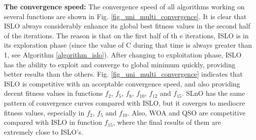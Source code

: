 \documentclass[a4paper,13pt,2p]{report}
\begin{document}
	\textbf{The convergence speed:} The convergence speed of all algorithms working on several functions are shown in Fig. \ref{fig_uni_multi_convergence}. It is clear that ISLO always considerably enhance its global best fitness values in the second half of the iterations. The reason is that on the first half of th e iterations, ISLO is in its exploration phase (since the value of C during that time is always greater than 1, see Algorithm \ref{algorithm_islo}). After changing to exploitation phase, ISLO has the ability to exploit and converge to global minimum quickly, providing better results than the others. Fig. \ref{fig_uni_multi_convergence} indicates that ISLO is competitive with an acceptable convergence speed, and also providing decent fitness values in functions $f_2$, $f_5$, $f_8$, $f_{10}$, $f_{12} $ and $f_{15}$. SLnO has the same pattern of convergence curves compared with ISLO, but it coverges to mediocre fitness values, especially in $f_2$, $f_5$ and $f_{10}$. Also, WOA and QSO are competitive compared with ISLO in function $f_{15}$, where the final results of them are extremely close to ISLO's.
	
\end{document}
